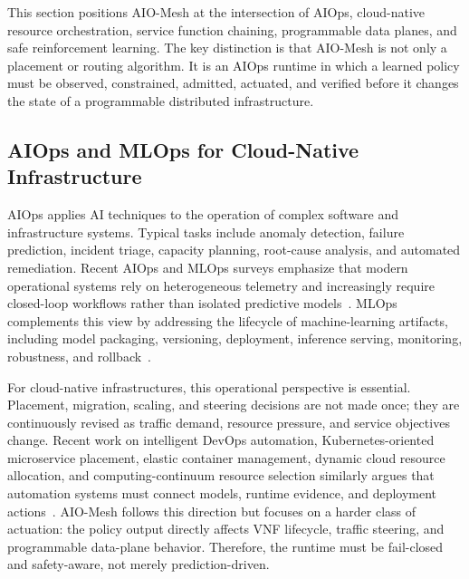 \documentclass[final,5p]{elsarticle}
\begin{document}
This section positions AIO-Mesh at the intersection of AIOps, cloud-native resource orchestration, service function chaining, programmable data planes, and safe reinforcement learning. The key distinction is that AIO-Mesh is not only a placement or routing algorithm. It is an AIOps runtime in which a learned policy must be observed, constrained, admitted, actuated, and verified before it changes the state of a programmable distributed infrastructure.

\subsection{AIOps and MLOps for Cloud-Native Infrastructure}
\label{subsec:related_aiops}

AIOps applies AI techniques to the operation of complex software and infrastructure systems. Typical tasks include anomaly detection, failure prediction, incident triage, capacity planning, root-cause analysis, and automated remediation. Recent AIOps and MLOps surveys emphasize that modern operational systems rely on heterogeneous telemetry and increasingly require closed-loop workflows rather than isolated predictive models~\cite{diazdearcaya2024joint,zhang2025aiopsllm}. MLOps complements this view by addressing the lifecycle of machine-learning artifacts, including model packaging, versioning, deployment, inference serving, monitoring, robustness, and rollback~\cite{kreuzberger2023mlops,eken2025mlops,bayram2025trustworthy}.

For cloud-native infrastructures, this operational perspective is essential. Placement, migration, scaling, and steering decisions are not made once; they are continuously revised as traffic demand, resource pressure, and service objectives change. Recent work on intelligent DevOps automation, Kubernetes-oriented microservice placement, elastic container management, dynamic cloud resource allocation, and computing-continuum resource selection similarly argues that automation systems must connect models, runtime evidence, and deployment actions~\cite{eramo2024architecture,ding2023kubernetes,mao2023flowcon,chen2023workloadwindows,chen2024crossedge,sedghani2024space4aid}. AIO-Mesh follows this direction but focuses on a harder class of actuation: the policy output directly affects VNF lifecycle, traffic steering, and programmable data-plane behavior. Therefore, the runtime must be fail-closed and safety-aware, not merely prediction-driven.
\end{document}
